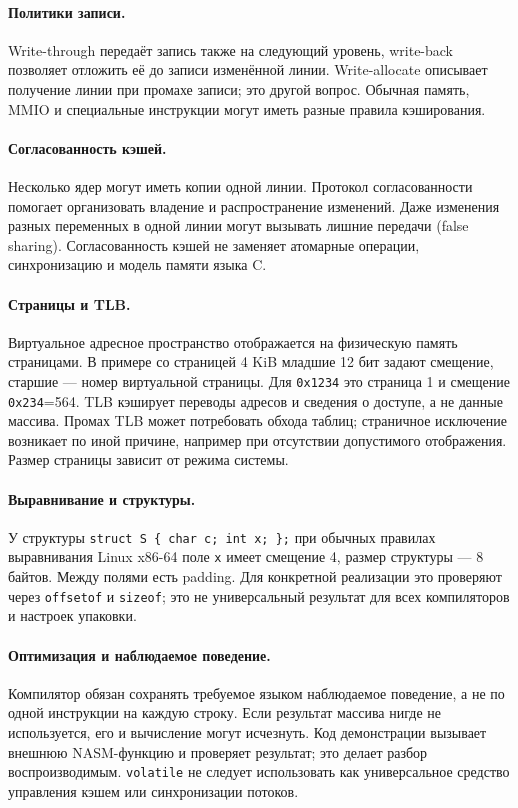 \paragraph{Политики записи.}
Write-through передаёт запись также на следующий уровень, write-back
позволяет отложить её до записи изменённой линии. Write-allocate описывает
получение линии при промахе записи; это другой вопрос. Обычная память,
MMIO и специальные инструкции могут иметь разные правила кэширования.

\paragraph{Согласованность кэшей.}
Несколько ядер могут иметь копии одной линии. Протокол согласованности
помогает организовать владение и распространение изменений. Даже изменения
разных переменных в одной линии могут вызывать лишние передачи
(false sharing). Согласованность кэшей не заменяет атомарные операции,
синхронизацию и модель памяти языка C.

\paragraph{Страницы и TLB.}
Виртуальное адресное пространство отображается на физическую память
страницами. В примере со страницей 4 KiB младшие 12 бит задают смещение,
старшие --- номер виртуальной страницы. Для \texttt{0x1234} это страница 1
и смещение \texttt{0x234}=564. TLB кэширует переводы адресов и сведения о
доступе, а не данные массива. Промах TLB может потребовать обхода таблиц;
страничное исключение возникает по иной причине, например при отсутствии
допустимого отображения. Размер страницы зависит от режима системы.

\paragraph{Выравнивание и структуры.}
У структуры \texttt{struct S \{ char c; int x; \};} при обычных правилах
выравнивания Linux x86-64 поле \texttt{x} имеет смещение 4, размер структуры
--- 8 байтов. Между полями есть padding. Для конкретной реализации это
проверяют через \texttt{offsetof} и \texttt{sizeof}; это не универсальный
результат для всех компиляторов и настроек упаковки.

\paragraph{Оптимизация и наблюдаемое поведение.}
Компилятор обязан сохранять требуемое языком наблюдаемое поведение, а не
по одной инструкции на каждую строку. Если результат массива нигде не
используется, его и вычисление могут исчезнуть. Код демонстрации вызывает
внешнюю NASM-функцию и проверяет результат; это делает разбор воспроизводимым.
\texttt{volatile} не следует использовать как универсальное средство
управления кэшем или синхронизации потоков.

